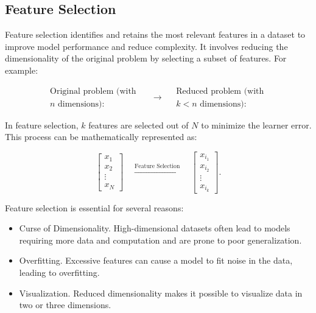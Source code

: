 	
	
	
	\subsection{Feature Selection}
	
	Feature selection identifies and retains the most relevant features in a dataset to improve model performance and reduce complexity. It involves reducing the dimensionality of the original problem by selecting a subset of features. For example:
	
	$$
	\begin{array}{c}
		\text{Original problem (with }\\
		n \text{ dimensions):}
	\end{array}
	\quad \longrightarrow \quad
	\begin{array}{c}
		\text{Reduced problem (with }\\
		 k < n \text{ dimensions):}
	\end{array}
	$$
	
	In feature selection, $k$ features are selected out of $N$ to minimize the learner error. This process can be mathematically represented as:
	
	$$
	\begin{bmatrix} 
		x_1 \\ x_2 \\ \vdots \\ x_N 
	\end{bmatrix} 
	\quad
	\xrightarrow{\text{Feature Selection}} 
	\quad 
	\begin{bmatrix} 
		x_{i_1} \\ x_{i_2} \\ \vdots \\ x_{i_k} 
	\end{bmatrix}.
	$$
	
	Feature selection is essential for several reasons:
	\begin{itemize}
		\item Curse of Dimensionality. High-dimensional datasets often lead to models requiring more data and computation and are prone to poor generalization.
		\item Overfitting. Excessive features can cause a model to fit noise in the data, leading to overfitting.
		\item Visualization. Reduced dimensionality makes it possible to visualize data in two or three dimensions.
	\end{itemize}
	
